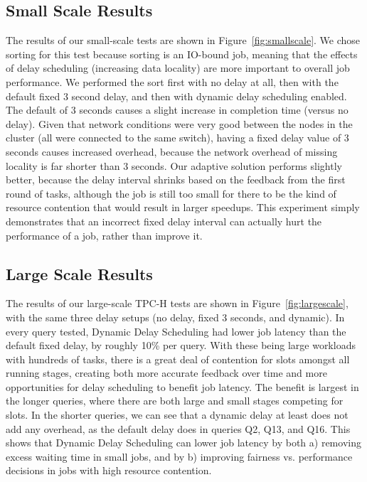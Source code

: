 \subsection{Small Scale Results}
The results of our small-scale tests are shown in Figure~\ref{fig:smallscale}.
We chose sorting for this test because sorting is an IO-bound job, meaning that
the effects of delay scheduling (increasing data locality) are more important
to overall job performance.
We performed the sort first with no delay at all, then with the default fixed 3 second delay,
and then with dynamic delay scheduling enabled. The default of
3 seconds causes a slight increase in completion time (versus no delay). Given
that network conditions were very good between the nodes in the cluster (all were
connected to the same switch), having a fixed delay value of 3 seconds causes
increased overhead, because the network overhead of missing locality is far
shorter than 3 seconds. Our adaptive solution performs slightly better, because
the delay interval shrinks based on the feedback from the first round of tasks,
although the job is still too small for there to be the kind of resource
contention that would result in larger speedups. This experiment simply
demonstrates that an incorrect fixed delay interval can actually hurt the
performance of a job, rather than improve it.

\subsection{Large Scale Results}

The results of our large-scale TPC-H tests are shown in Figure~\ref{fig:largescale}, with the same three 
delay setups (no delay, fixed 3 seconds, and dynamic). In every query tested, Dynamic Delay
Scheduling had lower job latency than the default fixed delay, by roughly 10\% per query. With
these being large workloads with hundreds of tasks, there is a great deal of contention for
slots amongst all running stages, creating both more accurate feedback over time and
more opportunities for delay scheduling to benefit job latency. The benefit is largest
in the longer queries, where there are both large and small stages competing for slots.
In the shorter queries, we can see that a dynamic delay at least does not add any overhead,
as the default delay does in queries Q2, Q13, and Q16. This shows that Dynamic Delay Scheduling
can lower job latency by both a) removing excess waiting time in small jobs, and by b) 
improving fairness vs. performance decisions in jobs with high resource contention.

